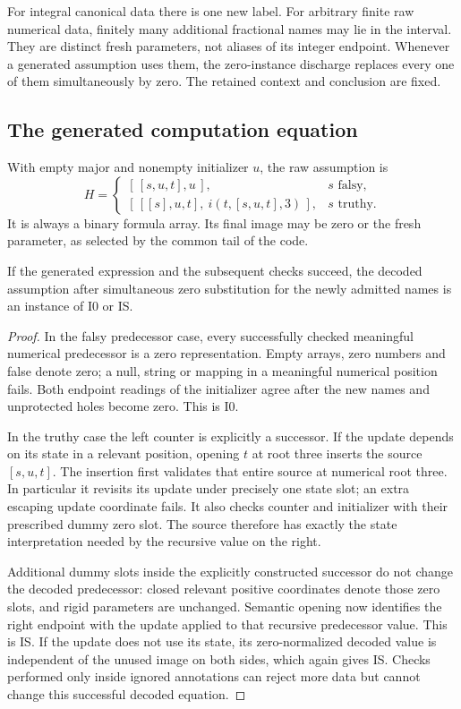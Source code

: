 For integral canonical data there is one new label. For arbitrary
finite raw numerical data, finitely many additional fractional names
may lie in the interval. They are distinct fresh parameters, not
aliases of its integer endpoint. Whenever a generated assumption
uses them, the zero-instance discharge replaces every one of them
simultaneously by zero. The retained context and conclusion are fixed.

\subsection{The generated computation equation}

With empty major and nonempty initializer \(u\), the raw assumption is
\[
 H=\begin{cases}
 [\,[s,u,t],u\,],&s\text{ falsy},\\
 [\,[[s],u,t],\ i(t,[s,u,t],3)\,],&s\text{ truthy}.
 \end{cases}
\]
It is always a binary formula array. Its final image may be zero or
the fresh parameter, as selected by the common tail of the code.

\begin{lemma}
If the generated expression and the subsequent checks succeed, the
decoded assumption after simultaneous zero substitution for the newly
admitted names is an instance of I0 or IS.
\end{lemma}
\begin{proof}
In the falsy predecessor case, every successfully checked meaningful
numerical predecessor is a zero representation. Empty arrays, zero
numbers and false denote zero; a null, string or mapping in a meaningful
numerical position fails. Both endpoint readings of the initializer
agree after the new names and unprotected holes become zero. This is I0.

In the truthy case the left counter is explicitly a successor.
If the update depends on its state in a relevant position, opening
\(t\) at root three inserts the source \([s,u,t]\). The insertion
first validates that entire source at numerical root three. In
particular it revisits its update under precisely one state slot;
an extra escaping update coordinate fails. It also checks counter
and initializer with their prescribed dummy zero slot. The source
therefore has exactly the state interpretation needed by the
recursive value on the right.

Additional dummy slots inside the explicitly constructed successor
do not change the decoded predecessor: closed relevant positive
coordinates denote those zero slots, and rigid parameters are
unchanged. Semantic opening now identifies the right endpoint with
the update applied to that recursive predecessor value. This is IS.
If the update does not use its state, its zero-normalized decoded
value is independent of the unused image on both sides, which again
gives IS. Checks performed only inside ignored annotations can
reject more data but cannot change this successful decoded equation.
\end{proof}

